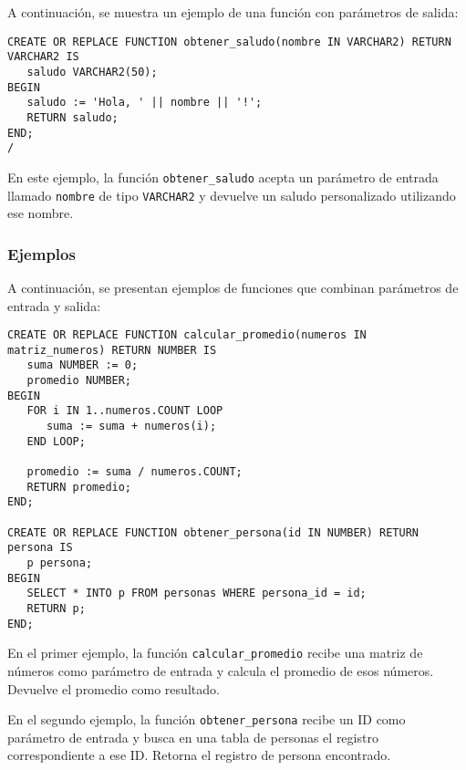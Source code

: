 \documentclass[executivepaper]{article}
\begin{document}
A continuación, se muestra un ejemplo de una función con parámetros de salida:

\begin{lstlisting}
CREATE OR REPLACE FUNCTION obtener_saludo(nombre IN VARCHAR2) RETURN VARCHAR2 IS
   saludo VARCHAR2(50);
BEGIN
   saludo := 'Hola, ' || nombre || '!';
   RETURN saludo;
END;
/
\end{lstlisting}

En este ejemplo, la función \texttt{obtener\_saludo} acepta un parámetro de entrada llamado \texttt{nombre} de tipo \texttt{VARCHAR2} y devuelve un saludo personalizado utilizando ese nombre.

\subsubsection*{Ejemplos}

A continuación, se presentan ejemplos de funciones que combinan parámetros de entrada y salida:

\begin{lstlisting}
CREATE OR REPLACE FUNCTION calcular_promedio(numeros IN matriz_numeros) RETURN NUMBER IS
   suma NUMBER := 0;
   promedio NUMBER;
BEGIN
   FOR i IN 1..numeros.COUNT LOOP
      suma := suma + numeros(i);
   END LOOP;
   
   promedio := suma / numeros.COUNT;
   RETURN promedio;
END;

CREATE OR REPLACE FUNCTION obtener_persona(id IN NUMBER) RETURN persona IS
   p persona;
BEGIN
   SELECT * INTO p FROM personas WHERE persona_id = id;
   RETURN p;
END;
\end{lstlisting}

En el primer ejemplo, la función \texttt{calcular\_promedio} recibe una matriz de números como parámetro de entrada y calcula el promedio de esos números. Devuelve el promedio como resultado.

En el segundo ejemplo, la función \texttt{obtener\_persona} recibe un ID como parámetro de entrada y busca en una tabla de personas el registro correspondiente a ese ID. Retorna el registro de persona encontrado.
\end{document}
